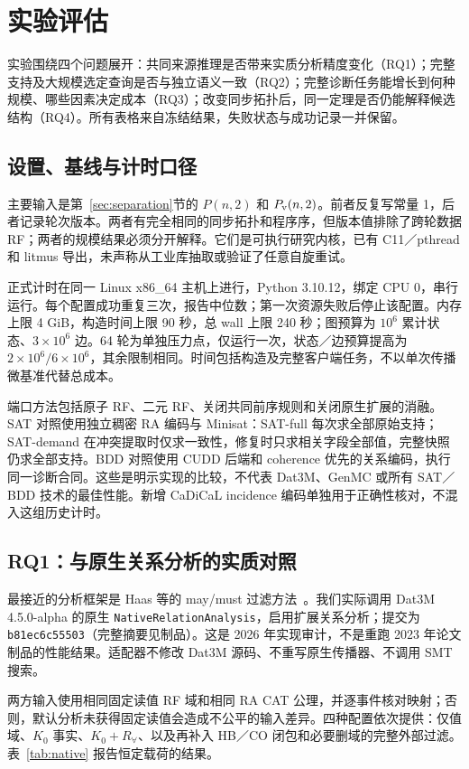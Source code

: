 \section{实验评估}\label{sec:eval}
实验围绕四个问题展开：共同来源推理是否带来实质分析精度变化（RQ1）；完整支持及大规模选定查询是否与独立语义一致（RQ2）；完整诊断任务能增长到何种规模、哪些因素决定成本（RQ3）；改变同步拓扑后，同一定理是否仍能解释候选结构（RQ4）。所有表格来自冻结结果，失败状态与成功记录一并保留。

\subsection{设置、基线与计时口径}
主要输入是第~\ref{sec:separation}节的 $P(n,2)$ 和 $P_{\mathrm v}(n,2)$。前者反复写常量 1，后者记录轮次版本。两者有完全相同的同步拓扑和程序序，但版本值排除了跨轮数据 RF；两者的规模结果必须分开解释。它们是可执行研究内核，已有 C11／pthread 和 litmus 导出，未声称从工业库抽取或验证了任意自旋重试。

正式计时在同一 Linux x86\_64 主机上进行，Python 3.10.12，绑定 CPU 0，串行运行。每个配置成功重复三次，报告中位数；第一次资源失败后停止该配置。内存上限 4 GiB，构造时间上限 90 秒，总 wall 上限 240 秒；图预算为 $10^6$ 累计状态、$3\times10^6$ 边。64 轮为单独压力点，仅运行一次，状态／边预算提高为 $2\times10^6/6\times10^6$，其余限制相同。时间包括构造及完整客户端任务，不以单次传播微基准代替总成本。

端口方法包括原子 RF、二元 RF、关闭共同前序规则和关闭原生扩展的消融。SAT 对照使用独立稠密 RA 编码与 Minisat：SAT-full 每次求全部原始支持；SAT-demand 在冲突提取时仅求一致性，修复时只求相关字段全部值，完整快照仍求全部支持。BDD 对照使用 CUDD 后端和 coherence 优先的关系编码，执行同一诊断合同。这些是明示实现的比较，不代表 Dat3M、GenMC 或所有 SAT／BDD 技术的最佳性能。新增 CaDiCaL incidence 编码单独用于正确性核对，不混入这组历史计时。

\subsection{RQ1：与原生关系分析的实质对照}\label{sec:native}
最接近的分析框架是 Haas 等的 may/must 过滤方法~\cite{haas2023}。我们实际调用 Dat3M 4.5.0-alpha 的原生 \texttt{NativeRelationAnalysis}，启用扩展关系分析；提交为 \texttt{b81ec6c55503}（完整摘要见制品）。这是 2026 年实现审计，不是重跑 2023 年论文制品的性能结果。适配器不修改 Dat3M 源码、不重写原生传播器、不调用 SMT 搜索。

两方输入使用相同固定读值 RF 域和相同 RA CAT 公理，并逐事件核对映射；否则，默认分析未获得固定读值会造成不公平的输入差异。四种配置依次提供：仅值域、$K_0$ 事实、$K_0+R_\forall$、以及再补入 HB／CO 闭包和必要删域的完整外部过滤。表~\ref{tab:native} 报告恒定载荷的结果。

